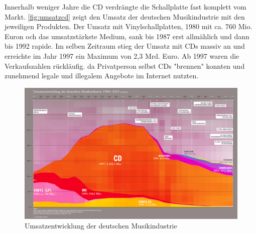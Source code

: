 Innerhalb weniger Jahre die CD verdrängte die Schallplatte fast komplett vom
Markt. \autoref{fig:umsatzcd} zeigt den Umsatz der deutschen Musikindustrie mit
den jeweiligen Produkten. Der Umsatz mit Vinylschallplatten, 1980 mit ca. 760
Mio. Euron och das umsatzstärkste Medium, sank bis 1987 erst allmählich und
dann bis 1992 rapide. Im selben Zeitraum stieg der Umsatz mit CDs massiv an und
erreichte im Jahr 1997 ein Maximum von 2,3 Mrd. Euro. Ab 1997 waren die
Verkaufszahlen rückläufig. da Privatperson selbst CDs 
"brennen" konnten und zunehmend legale und
illegalem Angebote im Internet nutzten.

\begin{figure}[h]
    \begin{center}
        \begin{minipage}[t]{\textwidth}
            \begin{center}
                \includegraphics[width=\textwidth]{Bilder/Optische_Datentraeger_Die_Compact_Disc/Geschichte/umsatzcd.png}
                \caption[Umsatzentwicklung der deutschen Musikindustrie \newline \url{http://www.musikindustrie.de/uploads/media/140325\_BVMI\_2013\_Jahrbuch\_ePaper\_V02.pdf} S. 7 (zuletzt aufgerufen am 03.08.2015)]{Umsatzentwicklung der deutschen Musikindustrie}
                \label{fig:umsatzcd}
            \end{center}
        \end{minipage}
    \end{center}
\end{figure}
